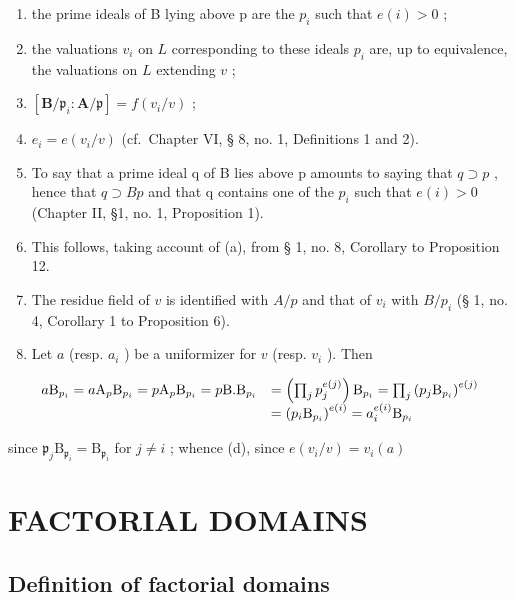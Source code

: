 \begin{enumerate}
\def\labelenumi{(\alph{enumi})}
\item
  the prime ideals of B lying above p are the \(p_{i}\) such that \(e(i) > 0\) ;
\item
  the valuations \(v_{i}\) on \(L\) corresponding to these ideals \(p_{i}\) are, up to equivalence, the valuations on \(L\) extending \(v\) ;
\item
  \([\mathbf{B} / \mathfrak{p}_i\colon \mathbf{A} / \mathfrak{p}] = f(v_i / v)\) ;
\item
  \(e_i = e(v_i / v)\) (cf.~Chapter VI, § 8, no. 1, Definitions 1 and 2).
\item
  To say that a prime ideal q of B lies above p amounts to saying that \(q \supset p\) , hence that \(q \supset Bp\) and that q contains one of the \(p_i\) such that \(e(i) > 0\) (Chapter II, §1, no. 1, Proposition 1).
\item
  This follows, taking account of (a), from § 1, no. 8, Corollary to Proposition 12.
\item
  The residue field of \(v\) is identified with \(A / p\) and that of \(v_i\) with \(B / p_i\) (§ 1, no. 4, Corollary 1 to Proposition 6).
\item
  Let \(a\) (resp. \(a_i\) ) be a uniformizer for \(v\) (resp. \(v_i\) ). Then
\end{enumerate}

\[
\begin{array}{r l} a \mathrm{B} _ {p _ {i}} = a \mathrm{A} _ {p} \mathrm{B} _ {p _ {i}} = p \mathrm{A} _ {p} \mathrm{B} _ {p _ {i}} = p \mathrm{B}. \mathrm{B} _ {p _ {i}} & = \left(\prod_ {j} p _ {j} ^ {e (j)}\right) \mathrm{B} _ {p _ {i}} = \prod_ {j} \left(p _ {j} \mathrm{B} _ {p _ {i}}\right) ^ {e (j)} \\ & = \left(p _ {i} \mathrm{B} _ {p _ {i}}\right) ^ {e (i)} = a _ {i} ^ {e (i)} \mathrm{B} _ {p _ {i}} \end{array}
\]

since \(\mathfrak{p}_j\mathrm{B}_{\mathfrak{p}_i} = \mathrm{B}_{\mathfrak{p}_i}\) for \(j\neq i\) ; whence (d), since \(e(v_{i} / v) = v_{i}(a)\)

\section{FACTORIAL DOMAINS}

\subsection{Definition of factorial domains}

